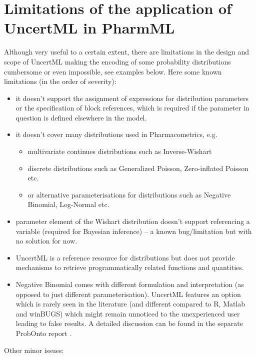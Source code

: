 \section{Limitations of the application of UncertML in PharmML}
\label{sec:uncertmlLimits}
Although very useful to a certain extent, there are limitations in
the design and scope of UncertML making the encoding of some 
probability distributions cumbersome or even impossible, see examples below. 
Here some known limitations (in the order of severity):
\begin{itemize}
\item
it doesn't support the assignment of expressions for distribution parameters or 
the specification of block references, which is required if the parameter in question 
is defined elsewhere in the model. 
\item
it doesn't cover many distributions used in Pharmacometrics, e.g. 
\begin{itemize}
\item 
multivariate continues distributions such as Inverse-Wishart
\item
discrete distributions such as Generalized Poisson, Zero-inflated Poisson etc.
\item
or alternative parameterisations for distributions such as Negative Binomial, 
Log-Normal etc.
\end{itemize}
\item
{} parameter element of the Wishart distribution doesn't support
referencing a variable (required for Bayesian inference) -- a known bug/limitation 
but with no solution for now.
\item
UncertML is a reference resource for distributions but does not provide 
mechanisms to retrieve programmatically related functions and
quantities.  
\item
Negative Binomial comes with different formulation and interpretation 
(as opposed to just different parameterisation). UncertML features an option which is 
rarely seen in the literature (and different compared to R, Matlab and winBUGS) 
which might remain unnoticed to the unexperienced user leading to false results.
A detailed discussion can be found in the separate ProbOnto report \cite{ProbOnto:2015a}.
\end{itemize}
Other minor issues:
